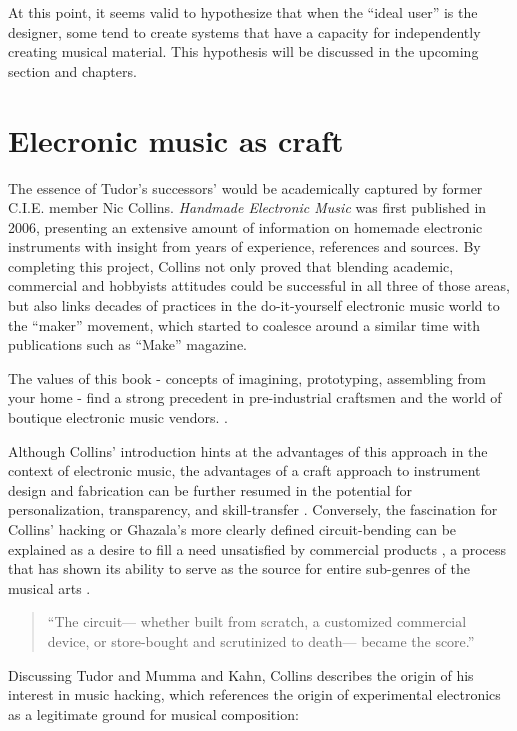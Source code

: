 \begin{itemize}
At this point, it seems valid to hypothesize that when the ``ideal user'' is the designer, some tend to create systems that have a capacity for independently creating musical material. This hypothesis will be discussed in the upcoming section and chapters.  

\section{Elecronic music as craft} 

	The essence of Tudor’s successors’ would be academically captured by former C.I.E. member Nic Collins. \emph{Handmade Electronic Music} was first published in 2006, presenting an extensive amount of information on homemade electronic instruments with insight from years of experience, references and sources. By completing this project, Collins not only proved that blending academic, commercial and hobbyists attitudes could be successful in all three of those areas, but also links decades of practices in the do-it-yourself electronic music world to the “maker” movement, which started to coalesce around a similar time with publications such as “Make” magazine.

	The values of this book - concepts of imagining, prototyping, assembling from your home - find a strong precedent in pre-industrial craftsmen and the world of boutique electronic music vendors.   \citep{collins2006,ghazala2005,kuivila2004}. 

Although Collins’ introduction hints at the advantages of this approach in the context of electronic music, the advantages of a craft approach to instrument design and fabrication can be further resumed in the potential for personalization, transparency, and skill-transfer \citep{perner2011}. Conversely, the fascination for Collins’ hacking or Ghazala’s more clearly defined circuit-bending can be explained as a desire to fill a need unsatisfied by commercial products \citep{dunne2005}, a process that has shown its ability to serve as the source for entire sub-genres of the musical arts \citep{dunne2005,kelly2009,novak2013}. 
\begin{quote}
“The circuit— whether built from scratch, a customized commercial device, or store-bought and scrutinized to death— became the score.”
\citep{collins2004}
\end{quote}

	Discussing Tudor and Mumma and Kahn, Collins describes the origin of his interest in music hacking, which references the origin of experimental electronics as a legitimate ground for musical composition: 


\end{itemize}
